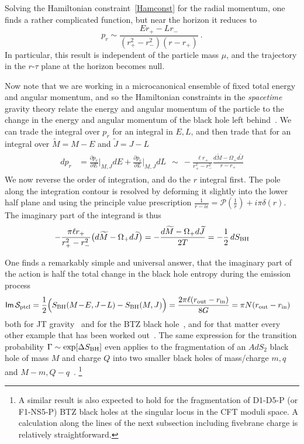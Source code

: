 \documentclass[11pt]{article}
\newcommand{\rcite}{\cite}
\def\Mtil{{\widetilde M}}
\def\Jtil{{\widetilde J}}
\def\eps{\epsilon}
\def\ptcl{{\rm ptcl}}
\def\BH{{\rm BH}}
\def\tight#1{\! #1 \!}  %
\def\sfI{{\mathsf I}}
\def\sfm{{\mathsf m}}
\def\half{\frac12}
\def\Im{{\sfI\sfm\,}}
\def\be{\begin{equation}}
\def\ee{\end{equation}}
\numberwithin{equation}{section}
\def\cP{\mathcal {P}} \def\cQ{\mathcal {Q}} \def\cR{\mathcal {R}}
\def\cS{\mathcal {S}} \def\cT{\mathcal {T}} \def\cU{\mathcal {U}}
\def\sst{\scriptscriptstyle}
\def\half{\frac12}
\def\eps{\epsilon}
\def\exp{{\rm exp}}
\begin{document}
Solving the Hamiltonian constraint~\eqref{Hamconst} for the radial momentum, one finds a 
rather complicated function, but near the horizon it reduces to
\be
\label{prptcl}
p_r \sim \frac{E  r_+ - L  r_- }{(r_+^2-r_-^2)(r-r_+)}  ~.
\ee
In particular, this result is independent of the particle mass $\mu$, and the trajectory in the $r$-$\tau$ plane at the horizon becomes null.

Now note that we are working in a microcanonical ensemble of fixed total energy and angular momentum, and so the Hamiltonian constraints in the {\it spacetime} gravity theory relate the energy and angular momentum of the particle to the change in the energy and angular momentum of the black hole left behind~\rcite{Kraus:1994by,Kraus:1994fj,Parikh:1999mf}.  We can trade the integral over $p_r$ for an integral in $E ,L $, and then trade that for an integral over $\Mtil =M-E $ and $\Jtil =J-L $
\begin{align}
\begin{split}
dp_r &= \frac{\partial p_r}{\partial E }\bigg|_{\sst M,J} dE  + \frac{\partial p_r}{\partial L }\bigg|_{\sst M,J} dL   
~~\sim~ -\frac{\ell r_+}{r_+^2-r_-^2} \frac{d\Mtil  - \Omega_+ d\Jtil }{r-r_+}
\end{split}
\end{align}
We now reverse the order of integration, and do the $r$ integral first.
The pole along the integration contour is resolved by deforming it slightly into the lower half plane
and using the principle value prescription $\frac{1}{r-i\eps} = \cP( \frac1r) +i\pi\delta(r)$. 
The imaginary part of the integrand is thus
\be
-\frac{\pi \ell r_+}{r_+^2-r_-^2} \big(d\Mtil  - \Omega_+ d\Jtil \big) = - \frac{d\Mtil  - \Omega_+ d\Jtil }{2T} = -\half\,dS_\BH
\ee


One finds a remarkably simple and universal answer, that the imaginary part of the action is half the total change in the black hole entropy during the emission process
\begin{align}
\begin{split}
\label{tunnelamp}
\Im \cS_\ptcl &
 = \half \Big( S_\BH(M\tight-E ,J\tight-L) - S_\BH(M,J)\Big)  
 = \frac{2\pi\ell(r_{\rm out}-r_{\rm in})}{8G} 
 = \pi N (r_{\rm out}-r_{\rm in})
\end{split}
\end{align}
both for JT gravity~\rcite{Vagenas:2001sm,Aalsma:2018qwy} and for the BTZ black hole~\rcite{Vagenas:2001rm,Medved:2001ca,Liu:2005hj,Wu:2006pz}, and for that matter every other example that has been worked out~\rcite{Vanzo:2011wq}.
The same expression for the transition probability $\Gamma\sim \exp[\Delta S_\BH]$ even applies to the fragmentation of an $AdS_2$ black hole of mass $M$ and charge $Q$ into two smaller black holes of mass/charge $m,q$ and $M-m,Q-q$~\rcite{Maldacena:1998uz}.%
\footnote{A similar result is also expected to hold for the fragmentation of D1-D5-P (or F1-NS5-P) BTZ black holes at the singular locus in the CFT moduli space.  A calculation along the lines of the next subsection including fivebrane charge is relatively straightforward.}
\end{document}
